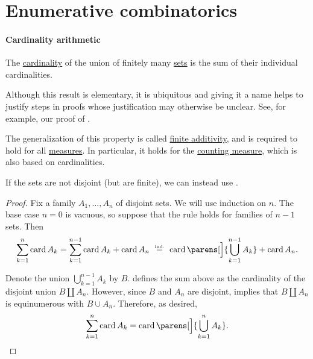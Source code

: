 \section{Enumerative combinatorics}\label{sec:enumerative_combinatorics}

\paragraph{Cardinality arithmetic}

\begin{theorem}\label{thm:cardinality_sum_rule}
  The \hyperref[thm:cardinality_existence]{cardinality} of the union of finitely many  \hyperref[def:set]{sets} is the sum of their individual cardinalities.
\end{theorem}
\begin{comments}
  \item Although this result is elementary, it is ubiquitous and giving it a name helps to justify steps in proofs whose justification may otherwise be unclear. See, for example, our proof of .

  \item The generalization of this property is called \hyperref[def:boolean_algebra_additive_function/finite]{finite additivity}, and is required to hold for all \hyperref[def:measure]{measures}. In particular, it holds for the \hyperref[def:counting_measure]{counting measure}, which is also based on cardinalities.

  \item If the sets are not disjoint (but are finite), we can instead use .
\end{comments}
\begin{proof}
  Fix a family \( A_1, \ldots, A_n \) of disjoint sets. We will use induction on \( n \). The base case \( n = 0 \) is vacuous, so suppose that the rule holds for families of \( n - 1 \) sets. Then
  \begin{equation*}
    \sum_{k=1}^n \card A_k
    =
    \sum_{k=1}^{n-1} \card A_k + \card A_n
    \reloset {\T{ind.}} =
    \card\parens[\Big]{ \bigcup_{k=1}^{n-1} A_k } + \card A_n.
  \end{equation*}

  Denote the union \( \bigcup_{k=1}^{n-1} A_k \) by \( B \).  defines the sum above as the cardinality of the disjoint union \( B \amalg A_n \). However, since \( B \) and \( A_n \) are disjoint,  implies that \( B \amalg A_n \) is equinumerous with \( B \cup A_n \). Therefore, as desired,
  \begin{equation*}
    \sum_{k=1}^n \card A_k = \card\parens[\Big]{ \bigcup_{k=1}^n A_k }.
  \end{equation*}
\end{proof}

